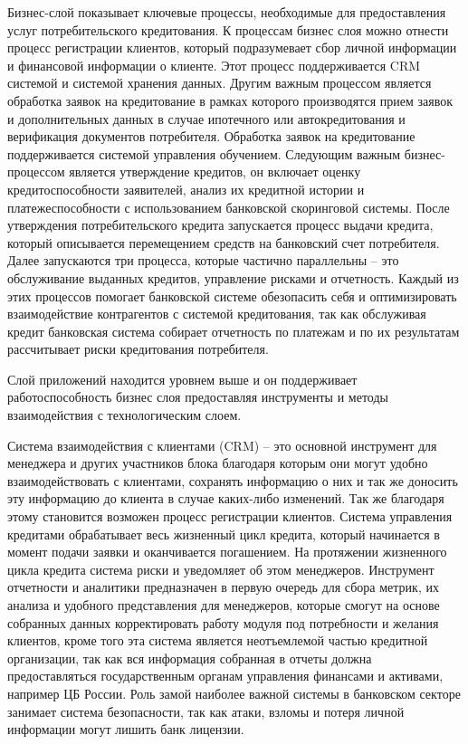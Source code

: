 \documentclass[14pt, a4paper]{extarticle}
\begin{document}
Бизнес-слой показывает ключевые процессы, необходимые для предоставления услуг
потребительского кредитования. К процессам бизнес слоя можно отнести процесс
регистрации клиентов, который подразумевает сбор личной информации и финансовой
информации о клиенте. Этот процесс поддерживается CRM системой и системой
хранения данных. Другим важным процессом является обработка заявок на
кредитование в рамках которого производятся прием заявок и дополнительных
данных в случае ипотечного или автокредитования и верификация документов
потребителя. Обработка заявок на кредитование поддерживается системой
управления обучением. Следующим важным бизнес-процессом является утверждение
кредитов, он включает оценку кредитоспособности заявителей, анализ их кредитной
истории и платежеспособности с использованием банковской скоринговой системы.
После утверждения потребительского кредита запускается процесс выдачи
кредита, который описывается перемещением средств на банковский счет
потребителя. Далее запускаются три процесса, которые частично параллельны --
это обслуживание выданных кредитов, управление рисками и отчетность. Каждый из
этих процессов помогает банковской системе обезопасить себя и оптимизировать
взаимодействие контрагентов с системой кредитования, так как обслуживая кредит
банковская система собирает отчетность по платежам и по их результатам
рассчитывает риски кредитования потребителя.

Слой приложений находится уровнем выше и он поддерживает работоспособность
бизнес слоя предоставляя инструменты и методы взаимодействия с технологическим
слоем.

Система взаимодействия с клиентами (CRM) -- это основной инструмент для
менеджера и других участников блока благодаря которым они могут удобно
взаимодействовать с клиентами, сохранять информацию о них и так же доносить эту
информацию до клиента в случае каких-либо изменений. Так же благодаря этому
становится возможен процесс регистрации клиентов. Система управления кредитами
обрабатывает весь жизненный цикл кредита, который начинается в момент подачи
заявки и оканчивается погашением. На протяжении жизненного цикла кредита
система риски и уведомляет об этом менеджеров. Инструмент отчетности и
аналитики предназначен в первую очередь для сбора метрик, их анализа и удобного
представления для менеджеров, которые смогут на основе собранных данных
корректировать работу модуля под потребности и желания клиентов, кроме того эта
система является неотъемлемой частью кредитной организации, так как вся
информация собранная в отчеты должна предоставляться государственным органам
управления финансами и активами, например ЦБ России. Роль замой наиболее важной
системы в банковском секторе занимает система безопасности, так как атаки,
взломы и потеря личной информации могут лишить банк лицензии.
\end{document}
